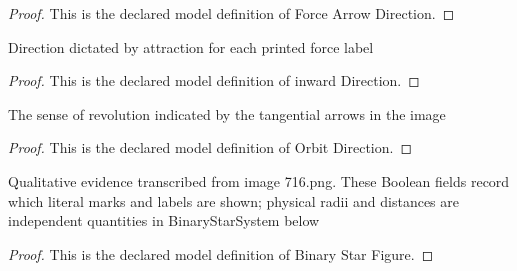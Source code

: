\begin{proof}
  This is the declared model definition of Force Arrow Direction.
\end{proof}
\begin{definition}
  \label{def:physics:phyx-mini-0716:phyxminiproblems-problemphyxmini0716-directedforcelabel-inwarddirection}
  Direction dictated by attraction for each printed force label
\end{definition}
\begin{proof}
  This is the declared model definition of inward Direction.
\end{proof}
\begin{definition}
  \label{def:physics:phyx-mini-0716:phyxminiproblems-problemphyxmini0716-orbitdirection}
  The sense of revolution indicated by the tangential arrows in the image
\end{definition}
\begin{proof}
  This is the declared model definition of Orbit Direction.
\end{proof}
\begin{definition}
  \label{def:physics:phyx-mini-0716:phyxminiproblems-problemphyxmini0716-binarystarfigure}
  Qualitative evidence transcribed from image 716.png. These Boolean fields record which literal marks and labels are shown; physical radii and distances are independent quantities in BinaryStarSystem below
\end{definition}
\begin{proof}
  This is the declared model definition of Binary Star Figure.
\end{proof}
